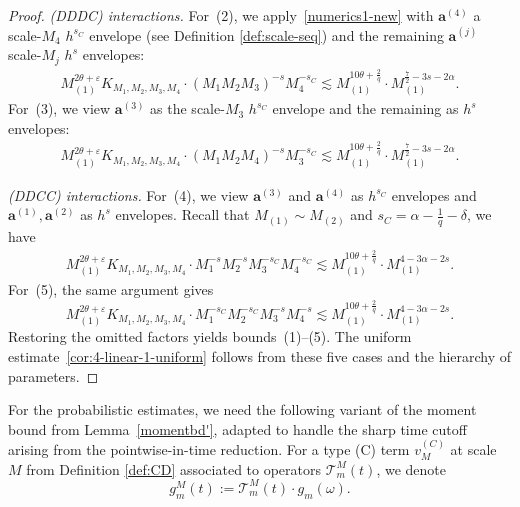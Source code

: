 \documentclass[11pt,reqno,english]{amsart}
\numberwithin{equation}{section}
\theoremstyle{plain}
\theoremstyle{definition}
\theoremstyle{remark}
\begin{document}
\begin{proof}
	\emph{(DDDC) interactions.}
	For~(2), we apply~\eqref{numerics1-new} with $\mathbf{a}^{(4)}$ a scale-$M_4$ $h^{s_C}$ envelope (see Definition \ref{def:scale-seq}) and the remaining $\mathbf{a}^{(j)}$ scale-$M_j$ $h^s$ envelopes:
	\begin{align*}
		M_{(1)}^{2\theta+\varepsilon}
		K_{M_1,M_2,M_3,M_4}\cdot(M_1 M_2 M_3)^{-s}M_4^{-s_C}
		\lesssim
		M_{(1)}^{10\theta+\frac{2}{q}}\cdot M_{(1)}^{\frac72-3s-2\alpha}.
	\end{align*}
	For~(3), we view $\mathbf{a}^{(3)}$ as the scale-$M_3$ $h^{s_C}$ envelope and the remaining as $h^s$ envelopes:
	\begin{align*}
		M_{(1)}^{2\theta+\varepsilon}
		K_{M_1,M_2,M_3,M_4}\cdot(M_1 M_2 M_4)^{-s}M_3^{-s_C}
		\lesssim
		M_{(1)}^{10\theta+\frac{2}{q}}\cdot M_{(1)}^{\frac72-3s-2\alpha}.
	\end{align*}

	\emph{(DDCC) interactions.}
	For~(4), we view $\mathbf{a}^{(3)}$ and $\mathbf{a}^{(4)}$ as $h^{s_C}$ envelopes and $\mathbf{a}^{(1)},\mathbf{a}^{(2)}$ as $h^s$ envelopes.
	Recall that $M_{(1)}\sim M_{(2)}$ and $s_C=\alpha-\frac1q-\delta$, we have
	\begin{align*}
		M_{(1)}^{2\theta+\varepsilon}
		K_{M_1,M_2,M_3,M_4}\cdot M_1^{-s}M_2^{-s}M_3^{-s_C}M_4^{-s_C}
		\lesssim
		M_{(1)}^{10\theta+\frac{2}{q}}\cdot M_{(1)}^{4-3\alpha-2s}.
	\end{align*}
	For~(5), the same argument gives
	\[
	M_{(1)}^{2\theta+\varepsilon}
	K_{M_1,M_2,M_3,M_4}\cdot M_1^{-s_C}M_2^{-s_C}M_3^{-s}M_4^{-s}
	\lesssim
	M_{(1)}^{10\theta+\frac{2}{q}}\cdot M_{(1)}^{4-3\alpha-2s}.
	\]
	Restoring the omitted factors yields bounds~(1)--(5). The uniform estimate~\eqref{cor:4-linear-1-uniform} follows from these five cases and the hierarchy of parameters.
\end{proof}

For the probabilistic estimates, we need the following variant of the moment bound from Lemma~\ref{momentbd'}, adapted to handle the sharp time cutoff arising from the pointwise-in-time reduction. For a type (C) term $v_M^{(C)}$ at scale $M$ from Definition \ref{def:CD} associated to operators $\mathcal{T}_m^M(t)$, we denote
$$ g_m^{M}(t):=\mathcal{T}_m^M(t)\cdot g_m(\omega).
$$
\end{document}
